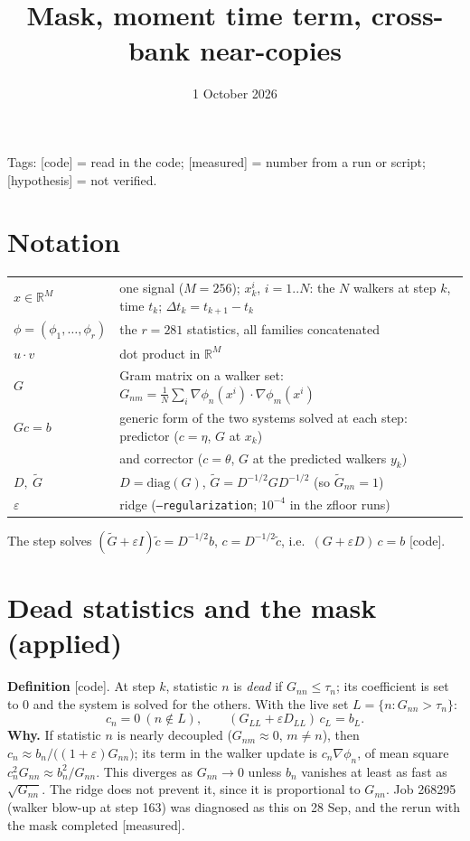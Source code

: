\documentclass[11pt,a4paper]{article}
\title{Mask, moment time term, cross-bank near-copies}
\date{1 October 2026}
\begin{document}
\maketitle

Tags: [code] = read in the code; [measured] = number from a run or script; [hypothesis] = not verified.

\section*{Notation}
\begin{tabular}{@{}lp{}@{}}
$x\in\mathbb R^M$ & one signal ($M=256$); $x^i_k$, $i=1..N$: the $N$ walkers at step $k$, time $t_k$; $\Delta t_k=t_{k+1}-t_k$\\
$\phi=(\phi_1,\dots,\phi_r)$ & the $r=281$ statistics, all families concatenated\\
$u\cdot v$ & dot product in $\mathbb R^M$\\
$G$ & Gram matrix on a walker set: $G_{nm}=\frac1N\sum_i\nabla\phi_n(x^i)\cdot\nabla\phi_m(x^i)$\\
$Gc=b$ & generic form of the two systems solved at each step: predictor ($c=\eta$, $G$ at $x_k$)\\
& and corrector ($c=\theta$, $G$ at the predicted walkers $y_k$)\\
$D,\ \tilde G$ & $D=\mathrm{diag}(G)$, $\tilde G=D^{-1/2}GD^{-1/2}$ (so $\tilde G_{nn}=1$)\\
$\varepsilon$ & ridge (\texttt{--regularization}; $10^{-4}$ in the zfloor runs)\\
\end{tabular}

The step solves $(\tilde G+\varepsilon I)\tilde c=D^{-1/2}b$, $c=D^{-1/2}\tilde c$, i.e.\ $(G+\varepsilon D)\,c=b$ [code].

\section{Dead statistics and the mask \hfill\small(applied)}
\textbf{Definition} [code]. At step $k$, statistic $n$ is \emph{dead} if $G_{nn}\le\tau_n$; its coefficient
is set to 0 and the system is solved for the others. With the live set $L=\{n:G_{nn}>\tau_n\}$:
\[
c_n=0\ (n\notin L),\qquad (G_{LL}+\varepsilon D_{LL})\,c_L=b_L .
\]
\textbf{Why.} If statistic $n$ is nearly decoupled ($G_{nm}\approx0$, $m\neq n$), then
$c_n\approx b_n/\big((1+\varepsilon)G_{nn}\big)$; its term in the walker update is $c_n\nabla\phi_n$, of mean square
$c_n^2G_{nn}\approx b_n^2/G_{nn}$. This diverges as $G_{nn}\to0$ unless $b_n$ vanishes at least as fast as
$\sqrt{G_{nn}}$. The ridge does not prevent it, since it is proportional to $G_{nn}$.
Job 268295 (walker blow-up at step 163) was diagnosed as this on 28 Sep, and the rerun with the
mask completed [measured].
\end{document}
